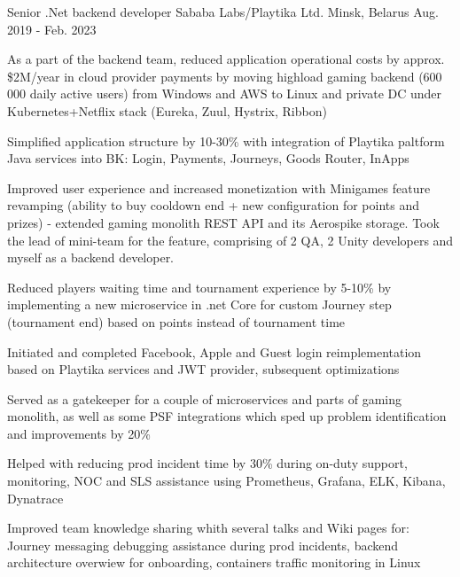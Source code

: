 

\begin{cventries}

  \cventry
    {Senior .Net backend developer} %
    {Sababa Labs/Playtika Ltd.} %
    {Minsk, Belarus} %
    {Aug. 2019 - Feb. 2023} %
    {
      \begin{cvitems} %
        \item {As a part of the backend team, reduced application operational costs by approx. \$2M/year in cloud provider payments by moving highload gaming backend (600 000 daily active users) from Windows and AWS to Linux and private DC under Kubernetes+Netflix stack (Eureka, Zuul, Hystrix, Ribbon)}
        \item {Simplified application structure by 10-30\% with integration of Playtika paltform Java services into BK: Login, Payments, Journeys, Goods Router, InApps}
        \item {Improved user experience and increased monetization with Minigames feature revamping (ability to buy cooldown end + new configuration for points and prizes) - extended gaming monolith REST API and its Aerospike storage. Took the lead of mini-team for the feature, comprising of 2 QA, 2 Unity developers and myself as a backend developer.}
        \item {Reduced players waiting time and tournament experience by 5-10\% by implementing a new microservice in .net Core for custom Journey step (tournament end) based on points instead of tournament time}
        \item {Initiated and completed Facebook, Apple and Guest login reimplementation based on Playtika services and JWT provider, subsequent optimizations}
        \item {Served as a gatekeeper for a couple of microservices and parts of gaming monolith, as well as some PSF integrations which sped up problem identification and improvements by 20\%}
        \item {Helped with reducing prod incident time by 30\% during on-duty support, monitoring, NOC and SLS assistance using Prometheus, Grafana, ELK, Kibana, Dynatrace}
        \item {Improved team knowledge sharing whith several talks and Wiki pages for: Journey messaging debugging assistance during prod incidents, backend architecture overwiew for onboarding, containers traffic monitoring in Linux}
      \end{cvitems}
    }


\end{cventries}
